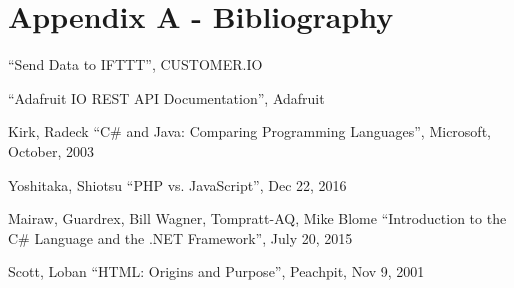 \documentclass[10pt,onecolumn,journal,draftclsnofoot]{IEEEtran}
\begin{document}
	\newpage
	\section{Appendix A - Bibliography}
	\par 
	[1] “Send Data to IFTTT”, CUSTOMER.IO
	\par
	[2] “Adafruit IO REST API Documentation”, Adafruit
	\par
	[3] Kirk, Radeck “C\# and Java: Comparing Programming Languages”, Microsoft, October, 2003
	\par
	[4] Yoshitaka, Shiotsu “PHP vs. JavaScript”, Dec 22, 2016
	\par
	[5] Mairaw, Guardrex, Bill Wagner, Tompratt-AQ, Mike Blome “Introduction to the C\# Language and the .NET Framework”, July 20, 2015
	\par
	[6] Scott, Loban “HTML: Origins and Purpose”, Peachpit, Nov 9, 2001
\end{document}
